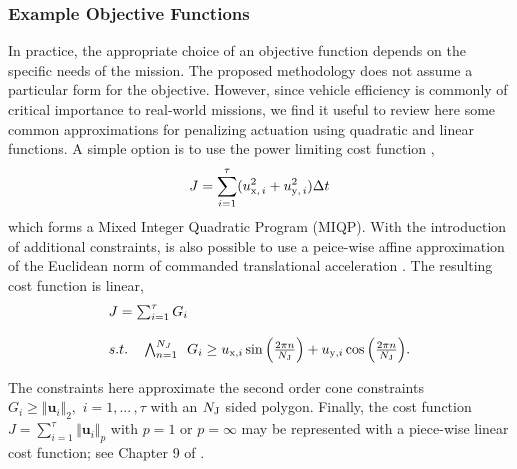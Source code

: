 \documentclass[twocolumn,letterpaper]{IEEEAerospaceCLS}  %
\theoremstyle{definition}
\begin{document}
\subsubsection{Example Objective Functions}
In practice, the appropriate choice of an objective function depends on the specific needs of the mission. The proposed methodology does not assume a particular form for the objective. However, since vehicle efficiency is commonly of critical importance to real-world missions, we find it useful to review here some common approximations for penalizing actuation using quadratic and linear functions. A simple option is to use the power limiting cost function \cite{guelman2001optimal,pardis1995optimal}, 
\begin{equation} \label{eq: sos_cost}
  J = \sum_{i=1}^\tau ( u_{{\rm x},\, i}^2 + u_{{\rm y},\, i}^2 ) \Delta t
\end{equation}
which forms a Mixed Integer Quadratic Program (MIQP). With the introduction of additional constraints, is also possible to use a peice-wise affine approximation of the Euclidean norm of commanded translational acceleration \cite{richards2002spacecraft}. The resulting cost function is linear, 
\begin{equation} \label{eq: 2norm_cost}
  \begin{array}{lc}
     J = \sum_{i=1}^\tau G_i  \\
     \\
     s.t. \quad \bigwedge_{n=1}^{N_J} \,\,\, G_i \geq u_{{\rm x}, i}\sin\Big(\frac{2\pi n}{N_{\rm J}}\Big)
  + u_{{\rm y}, i}\cos \Big(\frac{2\pi n}{N_{\rm J}}\Big).
  \end{array}
\end{equation}

The constraints here approximate the second order cone constraints $G_i\geq \Vert \boldsymbol{u}_i \Vert_2, \,\, i=1,...\,,\tau$ with an $N_{\rm J}$ sided polygon.
Finally, the cost function $J= \sum_{i=1}^\tau \Vert \boldsymbol{u}_i \Vert_p $ with $p=1$ or $p=\infty$ may be represented with a piece-wise linear cost function; see Chapter 9 of \cite{Borrelli:2017:PCL:3164811}. 
\end{document}
